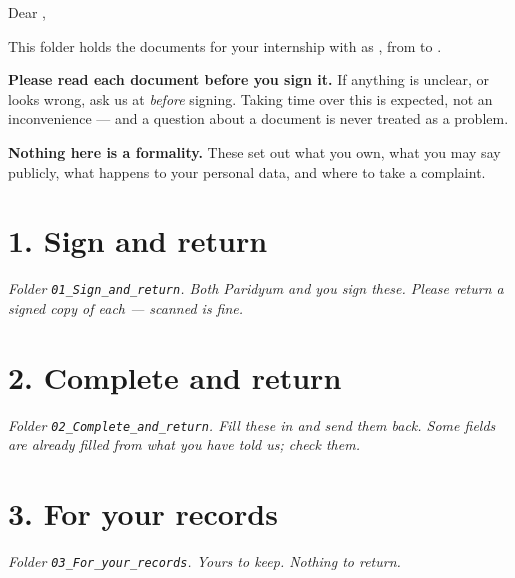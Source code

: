 \documentclass{paridyum}
\begin{document}
\paridyumletterhead
\paridyumdateref{\dkDocDate}{\dkDocRef}

Dear \dkPIdentityPreferredName,

\vspace{0.4em}
This folder holds the documents for your internship with \dkOrgName{} as
\dkPEngagementRole, from \dkPEngagementStartDate{} to \dkPEngagementEndDate.

\vspace{0.6em}
\begin{softbox}
\textbf{Please read each document before you sign it.} If anything is unclear,
or looks wrong, ask us at \dkOrgEmail{} \emph{before} signing. Taking time over
this is expected, not an inconvenience --- and a question about a document is
never treated as a problem.

\vspace{0.4em}
\textbf{Nothing here is a formality.} These set out what you own, what you may
say publicly, what happens to your personal data, and where to take a
complaint.
\end{softbox}

\section*{1. Sign and return}
\textit{Folder \texttt{01\_Sign\_and\_return}. Both Paridyum and you sign these.
Please return a signed copy of each --- scanned is fine.}
\begin{itemize}[leftmargin=*, noitemsep]
\dkPackSignItems
\end{itemize}

\section*{2. Complete and return}
\textit{Folder \texttt{02\_Complete\_and\_return}. Fill these in and send them
back. Some fields are already filled from what you have told us; check them.}
\begin{itemize}[leftmargin=*, noitemsep]
\dkPackCompleteItems
\end{itemize}

\section*{3. For your records}
\textit{Folder \texttt{03\_For\_your\_records}. Yours to keep. Nothing to return.}
\begin{itemize}[leftmargin=*, noitemsep]
\dkPackRecordsItems
\end{itemize}
\end{document}
